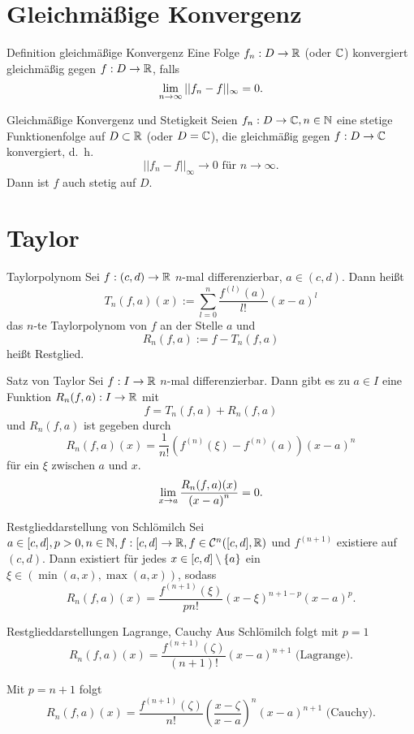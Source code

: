 \documentclass[main.tex]{subfiles}
\begin{document}
\section*{Gleichmäßige Konvergenz}

\begin{karte}{Definition gleichmäßige Konvergenz}
    Eine Folge \( f_n : D \rightarrow \mathbb{R} \) (oder \( \mathbb{C} \)) 
    konvergiert gleichmäßig gegen \( f: D \rightarrow \mathbb{R} \), 
    falls 
    \[ \lim\limits_{n\rightarrow\infty} ||f_n - f ||_\infty = 0. \]
\end{karte}
\begin{karte}{Gleichmäßige Konvergenz und Stetigkeit}
    Seien \( f_n : D \rightarrow \mathbb{C}, n\in\mathbb{N} \) eine 
    stetige Funktionenfolge auf \( D \subset \mathbb{R} \) 
    (oder \( D = \mathbb{C} \)), die gleichmäßig gegen 
    \( f: D \rightarrow \mathbb{C} \) konvergiert, d.\ h.\ 
    \[ ||f_n - f||_\infty \rightarrow 0 
    \text{ für } n\rightarrow\infty. \]
    Dann ist \(f\) auch stetig auf \(D\).
\end{karte}

\section*{Taylor}

\begin{karte}{Taylorpolynom}
    Sei \( f : (c,d) \rightarrow \mathbb{R} \) \(n\)-mal differenzierbar, 
    \( a \in (c,d) \). Dann heißt 
    \[ T_n(f,a)(x) := \sum_{l=0}^n 
    \frac{f^{(l)}(a)}{l!} {(x-a)}^l \]
    das \(n\)-te Taylorpolynom von \(f\) an der Stelle \(a\) 
    und \[ R_n(f,a) := f - T_n(f,a) \] heißt Restglied.
\end{karte}

\begin{karte}{Satz von Taylor}
    Sei \( f : I \rightarrow \mathbb{R} \) \( n \)-mal differenzierbar. Dann gibt es zu
    \( a \in I \) eine Funktion \( R_n(f,a) : I \rightarrow \mathbb{R} \) mit
    \[ f = T_n(f, a) + R_n(f,a) \]
    und \( R_n(f,a) \) ist gegeben durch
    \[ R_n(f,a)(x) = \frac{1}{n!} 
    \left( f^{(n)}(\xi) - f^{(n)}(a) \right) {(x-a)}^n \]
    für ein \( \xi \) zwischen \( a \) und \( x \).
    \[ \lim\limits_{x\rightarrow a} \frac{ R_n(f,a)(x) }{ {(x-a)}^n } = 0. \]
\end{karte}

\begin{karte}{Restglieddarstellung von Schlömilch}
    Sei \( a \in [c,d], p > 0, n \in \mathbb{N}, 
    f : [c,d] \rightarrow \mathbb{R}, f\in \mathcal{C}^n([c, d], \mathbb{R}) \) 
    und \( f^{(n+1)} \) existiere auf \( (c,d) \). Dann existiert 
    für jedes \( x \in [c,d]\setminus \{a\} \) ein \( \xi
    \in (\min(a,x), \max(a,x)) \), sodass 
    \[ R_n(f,a)(x) = \frac{f^{(n+1)}(\xi)}{ pn! } 
    (x - \xi)^{n+1-p} (x-a)^p. \]
\end{karte}

\begin{karte}{Restglieddarstellungen Lagrange, Cauchy}
    Aus Schlömilch folgt mit \( p=1 \)
    \[ R_n(f,a)(x) = \frac{f^{(n+1)}(\zeta)}{(n+1)!} (x-a)^{n+1} \text{ (Lagrange)}. \]
    
    Mit \( p = n+1 \) folgt
    \[ R_n(f,a)(x) = \frac{f^{(n+1)}(\zeta)}{n!} 
    \left( \frac{x- \zeta}{x-a} \right)^n (x-a)^{n+1} \text{ (Cauchy)}. \]
\end{karte}
\end{document}
